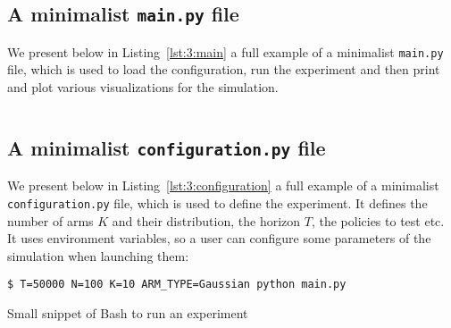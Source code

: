 \subsection{A minimalist \texttt{main.py} file}

We present below in Listing~\ref{lst:3:main} a full example of a minimalist \texttt{main.py} file,
which is used to load the configuration, run the experiment and then print and plot various visualizations for the simulation.

\begin{small}
    \inputminted[linenos=true,numbersep=5pt,frame=lines,framesep=2mm]{python3}{2-Chapters/3-Chapter/src/example_of_main_singleplayer.py}
\end{small}


\subsection{A minimalist \texttt{configuration.py} file}

We present below in Listing~\ref{lst:3:configuration} a full example of a minimalist \texttt{configuration.py} file,
which is used to define the experiment.
It defines the number of arms $K$ and their distribution, the horizon $T$, the policies to test etc.
It uses environment variables, so a user can configure some parameters of the simulation when launching them:


\begin{listing}[h!]
    \begin{verbatim}
$ T=50000 N=100 K=10 ARM_TYPE=Gaussian python main.py
    \end{verbatim}
    \caption{Small snippet of Bash to run an experiment}
    \label{lst:3:howToRunExperiment2}
\end{listing}

